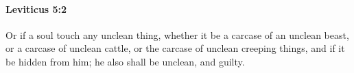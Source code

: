 
		\paragraph{Leviticus 5:2} %
			\label{LEVITICUS-5-2}

			Or if a soul touch any unclean thing, whether it be a carcase of an unclean beast, or a carcase of unclean cattle, or the carcase of unclean creeping things, and if it be hidden from him; he also shall be unclean, and guilty.



